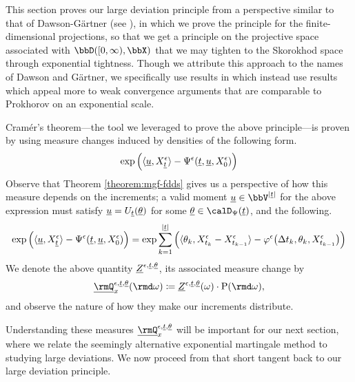 This section proves our large deviation principle from a perspective similar to that of Dawson-G\"artner (see \cite[Theorem 4.6.1]{dembo2010}), in which we prove the principle for the finite-dimensional projections, so that we get a principle on the projective space associated with $\pathSpace{[0,\infty)}{\stateSpace}$ that we may tighten to the Skorokhod space through exponential tightness.
Though we attribute this approach to the names of Dawson and G\"artner, we specifically use results in \cite{feng2006} which instead use results which appeal more to weak convergence arguments that are comparable to Prokhorov on an exponential scale.



Cram\'er's theorem---the tool we leveraged to prove the above principle---is proven by using measure changes induced by densities of the following form.
\begin{equation*}
  \exp\Big( {\langle \underline{u} , X^\epsilon_{\underline t} \rangle} - \Psi^\epsilon(\underline t, \underline{u}, X^\epsilon_0) \Big)
\end{equation*}
Observe that Theorem \ref{theorem:mgf-fdds} gives us a perspective of how this measure depends on the increments; a valid moment $\underline\momentVar \in \vecSpace^{|\underline t|}$ for the above expression must satisfy $\underline{u} = U_{\underline t}(\underline{\theta})$ for some $\underline\twistVar \in \momentSpace(\underline t)$, and the following.
\begin{equation*}
  \exp\Big( {\langle \underline{u} , X^\epsilon_{\underline t} \rangle} - \Psi^\epsilon(\underline t, \underline{u}, X^\epsilon_0) \Big) = 
  \exp\sum_{k=1}^{|\underline t|} \Big( {\langle \theta_k , X^\epsilon_{t_k}-X^\epsilon_{t_{k-1}} \rangle} - \varphi^\epsilon\big(\Delta t_k, \theta_k, X^\epsilon_{t_{k-1}} \big) \Big) 
\end{equation*}
We denote the above quantity $\underline{Z}^{\epsilon,\underline t, \underline{\theta}}$, its associated measure change by
\begin{equation*}
  \fddPrb^{\epsilon,\underline t,\underline\twistVar}_\stateVar(\rmd\omega) \defeq \fddDensity^{\epsilon,\underline t,\underline\twistVar}(\omega) \cdot \Prb(\rmd\omega),
\end{equation*}
and observe the nature of how they make our increments distribute.



Understanding these measures $\fddPrb^{\epsilon,\underline t,\underline\twistVar}_\stateVar$ will be important for our next section, where we relate the seemingly alternative exponential martingale method to studying large deviations.
We now proceed from that short tangent back to our large deviation principle.



